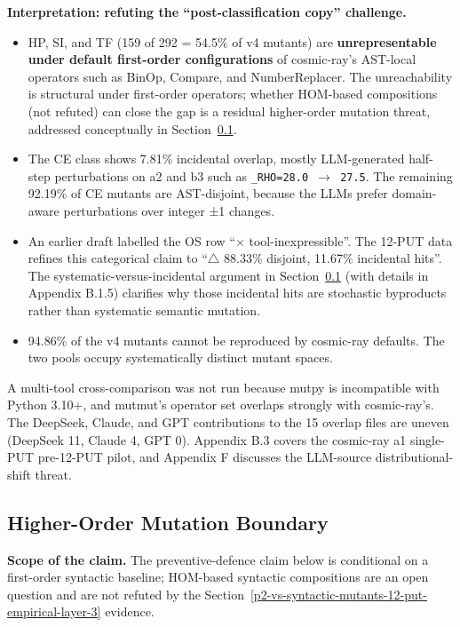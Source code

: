 \documentclass[12pt]{article}
\providecommand{\tightlist}{\setlength{\itemsep}{0pt}\setlength{\parskip}{0pt}}
\begin{document}
\textbf{Interpretation: refuting the ``post-classification copy''
challenge.}

\begin{itemize}
\tightlist
\item
  HP, SI, and TF (159 of 292 = 54.5\% of v4 mutants) are
  \textbf{unrepresentable under default first-order configurations} of
  cosmic-ray's AST-local operators such as BinOp, Compare, and
  NumberReplacer. The unreachability is structural under first-order
  operators; whether HOM-based compositions \citep{jia2008subtle} (not
  refuted) can close the gap is a residual higher-order mutation threat, addressed
  conceptually in Section~\ref{preventive-defence-framing}.
\item
  The CE class shows 7.81\% incidental overlap, mostly LLM-generated
  half-step perturbations on a2 and b3 such as
  \texttt{\_RHO=28.0\ $\to$\ 27.5}. The remaining 92.19\% of CE mutants are
  AST-disjoint, because the LLMs prefer domain-aware perturbations over
  integer ±1 changes.
\item
  An earlier draft labelled the OS row ``$\times$ tool-inexpressible''. The
  12-PUT data refines this categorical claim to ``$\bigtriangleup$ 88.33\% disjoint,
  11.67\% incidental hits''. The systematic-versus-incidental argument
  in Section~\ref{preventive-defence-framing} (with details in Appendix B.1.5) clarifies why those
  incidental hits are stochastic byproducts rather than systematic
  semantic mutation.
\item
  94.86\% of the v4 mutants cannot be reproduced by cosmic-ray defaults.
  The two pools occupy systematically distinct mutant spaces.
\end{itemize}

A multi-tool cross-comparison was not run because mutpy is incompatible
with Python 3.10+, and mutmut's operator set overlaps strongly with
cosmic-ray's. The DeepSeek, Claude, and GPT contributions to the 15
overlap files are uneven (DeepSeek 11, Claude 4, GPT 0). Appendix B.3
covers the cosmic-ray a1 single-PUT pre-12-PUT pilot, and Appendix F
discusses the LLM-source distributional-shift threat.

\subsection{Higher-Order Mutation Boundary}\label{preventive-defence-framing}

\textbf{Scope of the claim.} The preventive-defence claim below is
conditional on a first-order syntactic baseline; HOM-based syntactic
compositions are an open question and are not refuted by the Section~\ref{p2-vs-syntactic-mutants-12-put-empirical-layer-3}
evidence.
\end{document}
